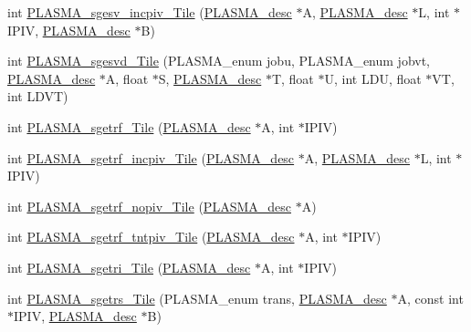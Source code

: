\begin{DoxyCompactItemize}
\item 
int \hyperlink{group__float__Tile_gae9d3d027fb34165de038eaa5d0bcebec_gae9d3d027fb34165de038eaa5d0bcebec}{P\+L\+A\+S\+M\+A\+\_\+sgesv\+\_\+incpiv\+\_\+\+Tile} (\hyperlink{structplasma__desc__t}{P\+L\+A\+S\+M\+A\+\_\+desc} $\ast$A, \hyperlink{structplasma__desc__t}{P\+L\+A\+S\+M\+A\+\_\+desc} $\ast$L, int $\ast$I\+P\+I\+V, \hyperlink{structplasma__desc__t}{P\+L\+A\+S\+M\+A\+\_\+desc} $\ast$B)
\item 
int \hyperlink{group__float__Tile_gad636cb478efcce3495f47a9a2e9fbc76_gad636cb478efcce3495f47a9a2e9fbc76}{P\+L\+A\+S\+M\+A\+\_\+sgesvd\+\_\+\+Tile} (P\+L\+A\+S\+M\+A\+\_\+enum jobu, P\+L\+A\+S\+M\+A\+\_\+enum jobvt, \hyperlink{structplasma__desc__t}{P\+L\+A\+S\+M\+A\+\_\+desc} $\ast$A, float $\ast$S, \hyperlink{structplasma__desc__t}{P\+L\+A\+S\+M\+A\+\_\+desc} $\ast$T, float $\ast$U, int L\+D\+U, float $\ast$V\+T, int L\+D\+V\+T)
\item 
int \hyperlink{group__float__Tile_ga1a6955304fcecceca1052439c28f3522_ga1a6955304fcecceca1052439c28f3522}{P\+L\+A\+S\+M\+A\+\_\+sgetrf\+\_\+\+Tile} (\hyperlink{structplasma__desc__t}{P\+L\+A\+S\+M\+A\+\_\+desc} $\ast$A, int $\ast$I\+P\+I\+V)
\item 
int \hyperlink{group__float__Tile_ga94fd97f1f6db26be8f5f230cd34a278f_ga94fd97f1f6db26be8f5f230cd34a278f}{P\+L\+A\+S\+M\+A\+\_\+sgetrf\+\_\+incpiv\+\_\+\+Tile} (\hyperlink{structplasma__desc__t}{P\+L\+A\+S\+M\+A\+\_\+desc} $\ast$A, \hyperlink{structplasma__desc__t}{P\+L\+A\+S\+M\+A\+\_\+desc} $\ast$L, int $\ast$I\+P\+I\+V)
\item 
int \hyperlink{group__float__Tile_gac69f83430a75ebaad0d19442761004b6_gac69f83430a75ebaad0d19442761004b6}{P\+L\+A\+S\+M\+A\+\_\+sgetrf\+\_\+nopiv\+\_\+\+Tile} (\hyperlink{structplasma__desc__t}{P\+L\+A\+S\+M\+A\+\_\+desc} $\ast$A)
\item 
int \hyperlink{group__float__Tile_gae07b9e0af4e3d12491dfe0a2cc6eef31_gae07b9e0af4e3d12491dfe0a2cc6eef31}{P\+L\+A\+S\+M\+A\+\_\+sgetrf\+\_\+tntpiv\+\_\+\+Tile} (\hyperlink{structplasma__desc__t}{P\+L\+A\+S\+M\+A\+\_\+desc} $\ast$A, int $\ast$I\+P\+I\+V)
\item 
int \hyperlink{group__float__Tile_ga6c9b470cb25b778f3a2328e1a7217868_ga6c9b470cb25b778f3a2328e1a7217868}{P\+L\+A\+S\+M\+A\+\_\+sgetri\+\_\+\+Tile} (\hyperlink{structplasma__desc__t}{P\+L\+A\+S\+M\+A\+\_\+desc} $\ast$A, int $\ast$I\+P\+I\+V)
\item 
int \hyperlink{group__float__Tile_gadb6246bd33d383f96297ddafdbfc0599_gadb6246bd33d383f96297ddafdbfc0599}{P\+L\+A\+S\+M\+A\+\_\+sgetrs\+\_\+\+Tile} (P\+L\+A\+S\+M\+A\+\_\+enum trans, \hyperlink{structplasma__desc__t}{P\+L\+A\+S\+M\+A\+\_\+desc} $\ast$A, const int $\ast$I\+P\+I\+V, \hyperlink{structplasma__desc__t}{P\+L\+A\+S\+M\+A\+\_\+desc} $\ast$B)

\end{DoxyCompactItemize}
